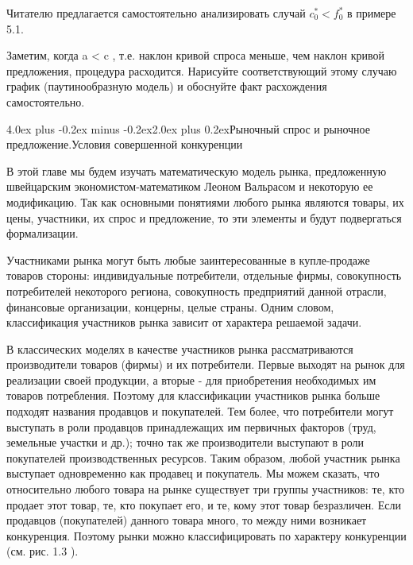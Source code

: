 \documentclass[12pt, 4paper]{book}
\makeatletter
\renewcommand{\section}{\@startsection{section}{1}{1pt}%
	{4.0ex plus -0.2ex minus -0.2ex}{2.0ex plus 0.2ex}{\centering\bf}}%
\makeatother
\begin{document}
{Читателю предлагается самостоятельно анализировать случай $c_{0}^{*} < f_{0}^{*}$ в примере 5.1.
\par

Заметим, когда a < c , т.е. наклон кривой спроса меньше, чем наклон кривой предложения, процедура расходится. Нарисуйте соответствующий этому случаю график (паутинообразную модель) и обоснуйте факт расхождения самостоятельно.
\newpage
\begin{center}
\section{Рыночный спрос и рыночное предложение.Условия совершенной конкуренции}
\end{center}
\par

В этой главе мы будем изучать математическую модель рынка, предложенную швейцарским экономистом-математиком Леоном Вальрасом и некоторую ее модификацию. Так как основными понятиями любого рынка являются товары, их цены, участники, их спрос и предложение, то эти элементы и будут подвергаться формализации.
\par

Участниками рынка могут быть любые заинтересованные в купле-продаже товаров стороны: индивидуальные потребители, отдельные фирмы, совокупность потребителей некоторого региона, совокупность предприятий данной отрасли, финансовые организации, концерны, целые страны. Одним словом, классификация участников рынка зависит от характера решаемой задачи.
\par

В классических моделях в качестве участников рынка рассматриваются производители товаров (фирмы) и их потребители. Первые выходят на рынок для реализации своей продукции, а вторые - для приобретения необходимых им товаров потребления. Поэтому для классификации участников рынка больше подходят названия продавцов и покупателей. Тем более, что потребители могут выступать в роли продавцов принадлежащих им первичных факторов (труд, земельные участки и др.); точно так же производители выступают в роли покупателей производственных ресурсов. Таким образом, любой участник рынка выступает одновременно как продавец и покупатель. Мы можем сказать, что относительно любого товара на рынке существует три группы участников: те, кто продает этот товар, те, кто покупает его, и те, кому этот товар безразличен. Если продавцов (покупателей) данного товара много, то между ними возникает конкуренция. Поэтому рынки можно классифицировать по характеру конкуренции (см. рис. 1.3 ).
\par

}
\end{document}
